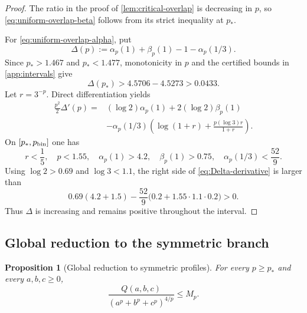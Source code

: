 \documentclass[11pt,reqno]{amsart}
\numberwithin{equation}{section}
\newtheorem{proposition}[proposition]{Proposition}
\theoremstyle{definition}
\theoremstyle{remark}
\begin{document}
\begin{proof}
The ratio in the proof of \cref{lem:critical-overlap} is decreasing in $p$,
so \eqref{eq:uniform-overlap-beta} follows from its strict inequality at $p_*$.

For \eqref{eq:uniform-overlap-alpha}, put
\[
  \Delta(p):=\alpha_p(1)+\beta_p(1)-1-\alpha_p(1/3).
\]
Since $p_*>1.467$ and $p_*<1.477$, monotonicity in $p$ and the certified
bounds in \cref{app:intervals} give
\[
  \Delta(p_*)
  >4.5706-4.5273>0.0433.
\]
Let $r=3^{-p}$.  Direct differentiation yields
\begin{equation}\label{eq:Delta-derivative}
\begin{aligned}
  \frac{p^2}{2}\Delta'(p)
  ={}&(\log2)\alpha_p(1)+2(\log2)\beta_p(1)\\
  &-\alpha_p(1/3)
  \left(\log(1+r)+\frac{p(\log3)r}{1+r}\right).
\end{aligned}
\end{equation}
On $[p_*,p_{\rm bin}]$ one has
\[
  r<\frac15,
  \quad p<1.55,
  \quad \alpha_p(1)>4.2,
  \quad \beta_p(1)>0.75,
  \quad \alpha_p(1/3)<\frac{52}{9}.
\]
Using $\log2>0.69$ and $\log3<1.1$, the right side of
\eqref{eq:Delta-derivative} is larger than
\[
  0.69(4.2+1.5)
  -\frac{52}{9}\bigl(0.2+1.55\cdot1.1\cdot0.2\bigr)>0.
\]
Thus $\Delta$ is increasing and remains positive throughout the interval.
\end{proof}

\subsection{Global reduction to the symmetric branch}

\begin{proposition}[Global reduction to symmetric profiles]\label{prop:global-symmetric-ternary}
For every $p\ge p_*$ and every $a,b,c\ge0$,
\begin{equation}\label{eq:global-symmetric-ternary}
  \frac{Q(a,b,c)}{(a^p+b^p+c^p)^{4/p}}\le M_p.
\end{equation}
\end{proposition}
\end{document}
